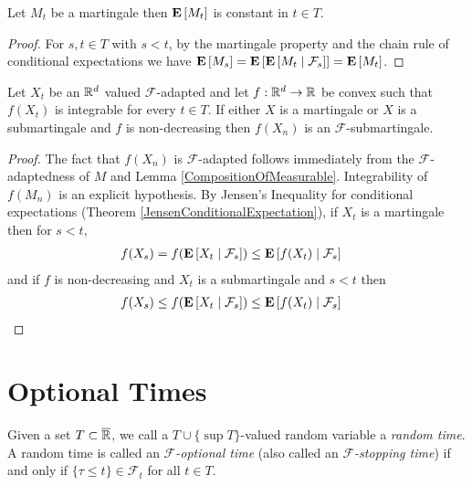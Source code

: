 \begin{lem}Let $M_t$ be a martingale then $\expectation{M_t}$ is
  constant in $t \in T$.
\end{lem}
\begin{proof}For $s,t \in T$ with $s < t$, by the
  martingale property and the chain rule of
  conditional expectations we have
$\expectation{M_s} = \expectation{\cexpectationlong{\mathcal{F}_s}{M_t}} = \expectation{M_t}$.
\end{proof}

\begin{prop}\label{ConvexFunctionOfMartingale}Let $X_t$ be an $\reals^d$ valued $\mathcal{F}$-adapted and let $f : \reals^d \to \reals$ be convex such that $f(X_t)$ is integrable for every $t \in T$.  If either $X$ is a martingale or $X$ is a submartingale and $f$ is non-decreasing then $f(X_n)$ is an $\mathcal{F}$-submartingale.
\end{prop}
\begin{proof}
The fact that $f(X_n)$ is $\mathcal{F}$-adapted follows immediately from the $\mathcal{F}$-adaptedness of $M$ and Lemma \ref{CompositionOfMeasurable}.  Integrability of $f(M_n)$ is an explicit hypothesis.  By Jensen's Inequality for conditional expectations (Theorem \ref{JensenConditionalExpectation}), if $X_t$ is a martingale then for $s < t$,
\begin{align*}
f(X_s) &= f(\cexpectationlong{\mathcal{F}_s}{X_t}) \leq \cexpectationlong{\mathcal{F}_s}{f( X_t)}
\end{align*}
and if $f$ is non-decreasing and $X_t$ is a submartingale and $s < t$ then
\begin{align*}
f(X_s) &\leq f(\cexpectationlong{\mathcal{F}_s}{X_t}) \leq \cexpectationlong{\mathcal{F}_s}{f( X_t)}
\end{align*}
\end{proof}

\section{Optional Times}

\begin{defn}Given a set $T \subset \overline{\reals}$, we call a $T
  \cup \lbrace \sup T \rbrace$-valued random variable a \emph{random
    time}.  A random time is called an
  \emph{$\mathcal{F}$-optional time} (also called an \emph{$\mathcal{F}$-stopping time}) if and only if $\lbrace \tau \leq
  t \rbrace \in \mathcal{F}_t$ for all $t \in T$.
\end{defn}

